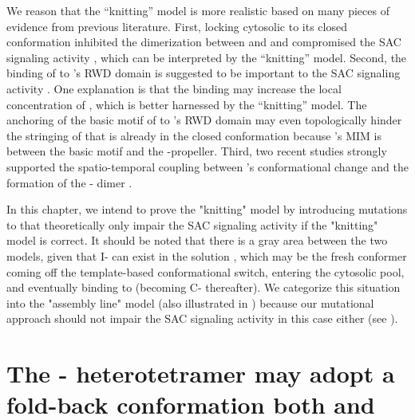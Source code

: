 We reason that the ``knitting'' model is more realistic based on many pieces of evidence from previous literature. First, locking cytosolic  to its closed conformation inhibited the dimerization between  and  and compromised the SAC signaling activity \cite{Ma+Poon2016, Ma+Poon2018, Kim2018}, which can be interpreted by the ``knitting'' model. Second, the binding of  to 's RWD domain is suggested to be important to the SAC signaling activity \cite{Kruse2014, SpMad1, Faesen2017, Ji2017eLife}. One explanation is that the binding may increase the local concentration of , which is better harnessed by the ``knitting'' model. The anchoring of the basic motif of  to 's RWD domain may even topologically hinder the stringing of  that is already in the closed conformation because 's MIM is between the basic motif and the \textbeta{}-propeller. Third, two recent studies strongly supported the spatio-temporal coupling between 's conformational change and the formation of the - dimer \cite{BUB1-CDC20-MAD1, Tripartite}.

In this chapter, we intend to prove the "knitting" model by introducing mutations to  that theoretically only impair the SAC signaling activity if the "knitting" model is correct. It should be noted that there is a gray area between the two models, given that I- can exist in the solution \cite{I-MAD2}, which may be the fresh  conformer coming off the template-based conformational switch, entering the cytosolic pool, and eventually binding to  (becoming C- thereafter). We categorize this situation into the "assembly line" model (also illustrated in ) because our mutational approach should not impair the SAC signaling activity in this case either (see ).

\section{The - heterotetramer may adopt a fold-back conformation both  and }


